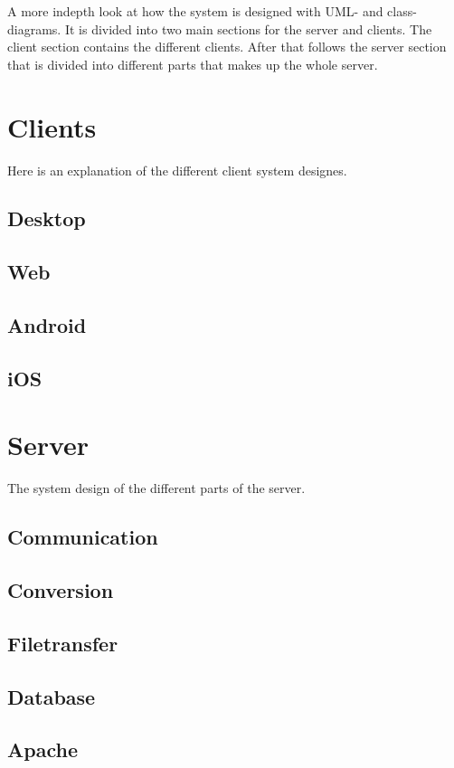 
A more indepth look at how the system is designed with UML- and class-diagrams. It is divided into two main sections for the server and clients. The client section contains the different clients. After that follows the server section that is divided into different parts that makes up the whole server. 

\section{Clients}
Here is an explanation of the  different client system designes.
\subsection{Desktop}

\FloatBarrier
\subsection{Web}


\FloatBarrier
\subsection{Android}

\FloatBarrier
\subsection{iOS}

\FloatBarrier
\section{Server}
The system design of the different parts of the server.
\subsection{Communication}

\FloatBarrier
\subsection{Conversion}

\FloatBarrier
\subsection{Filetransfer}

\FloatBarrier
\subsection{Database}

\FloatBarrier
\subsection{Apache}

\FloatBarrier
